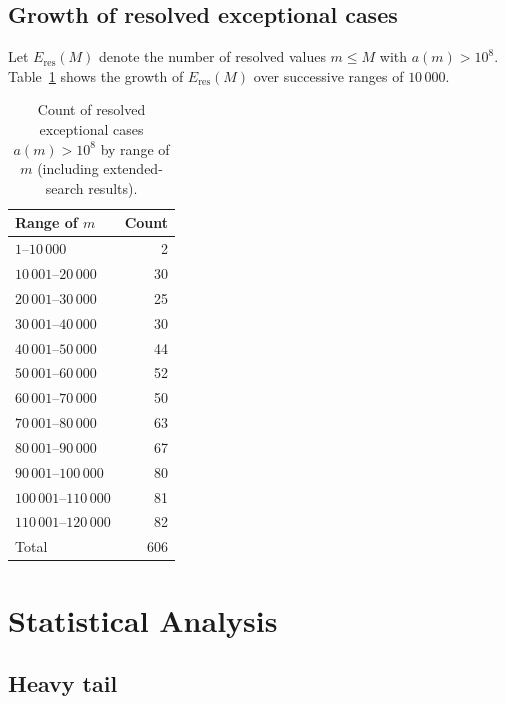 \documentclass[pdflatex,sn-mathphys-num,Numbered]{sn-jnl}
\theoremstyle{thmstyleone}
\theoremstyle{thmstylethree}
\theoremstyle{thmstyletwo}
\numberwithin{equation}{section}
\begin{document}
\subsection{Growth of resolved exceptional cases}
\label{sec:growth}

Let $E_{\mathrm{res}}(M)$ denote the number of resolved values
$m \leq M$ with $a(m) > 10^8$.
Table~\ref{tab:growth} shows the growth of $E_{\mathrm{res}}(M)$ over
successive ranges of $10\,000$.

\begin{table}[ht]
	\centering
	\caption{Count of resolved exceptional cases $a(m) > 10^8$
		by range of $m$ (including extended-search results).}
	\label{tab:growth}
	\begin{tabular}{lr}
		\toprule
		Range of $m$ & Count \\
		\midrule
		$1$--$10\,000$         &   2 \\
		$10\,001$--$20\,000$   &  30 \\
		$20\,001$--$30\,000$   &  25 \\
		$30\,001$--$40\,000$   &  30 \\
		$40\,001$--$50\,000$   &  44 \\
		$50\,001$--$60\,000$   &  52 \\
		$60\,001$--$70\,000$   &  50 \\
		$70\,001$--$80\,000$   &  63 \\
		$80\,001$--$90\,000$   &  67 \\
		$90\,001$--$100\,000$  &  80 \\
		$100\,001$--$110\,000$ &  81 \\
		$110\,001$--$120\,000$ &  82 \\
		\midrule
		Total & 606 \\
		\bottomrule
	\end{tabular}
\end{table}

\section{Statistical Analysis}
\label{sec:statistics}

\subsection{Heavy tail}
\label{sec:heavytail}
\end{document}
